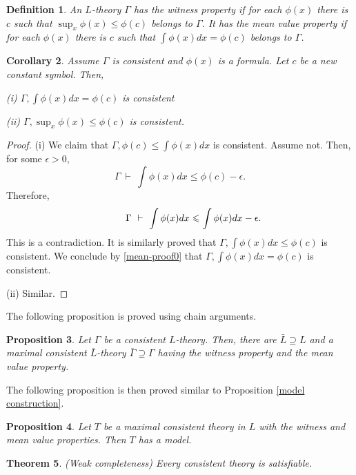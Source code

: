 \documentclass[12pt]{article}
\newtheorem{theorem}{Theorem}[section]
\newtheorem{proposition}[theorem]{Proposition}
\newtheorem{corollary}[theorem]{Corollary}
\newtheorem{definition}[theorem]{Definition}
\begin{document}
\begin{definition}
\em{An $L$-theory $\Gamma$ has \emph{the witness property} if for each $\phi(x)$ there is $c$ such that
$\sup_x\phi(x)\leqslant\phi(c)$ belongs to $\Gamma$. It has the \emph{mean value property}
if for each $\phi(x)$ there is $c$ such that $\int\phi(x)dx=\phi(c)$ belongs to $\Gamma$.}
\end{definition}

\begin{corollary}
Assume $\Gamma$ is consistent and $\phi(x)$ is a formula. Let $c$ be a new constant symbol. Then,

(i) $\Gamma,\int\phi(x)dx=\phi(c)$ is consistent

(ii) $\Gamma,\sup_x\phi(x)\leqslant\phi(c)$ is consistent.
\end{corollary}
\begin{proof}
(i) We claim that $\Gamma,\phi(c)\leqslant\int\phi(x)dx$ is consistent.
Assume not. Then, for some $\epsilon>0$, $$\Gamma\ \vdash\ \int\phi(x)dx\leqslant\phi(c)-\epsilon.$$
Therefore, $$\hspace{10mm}\Gamma\ \vdash\ \int\phi(x)dx\leqslant\int\phi(x)dx-\epsilon.$$
This is a contradiction. It is similarly proved that $\Gamma,\int\phi(x)dx\leqslant\phi(c)$
is consistent. We conclude by \ref{mean-proof0} that
$\Gamma,\int\phi(x)dx=\phi(c)$ is consistent.

(ii) Similar.
\end{proof}

The following proposition is proved using chain arguments.

\begin{proposition} \label{witness}
Let $\Gamma$ be a consistent $L$-theory. Then, there are $\bar L\supseteq L$ and a maximal
consistent $\bar L$-theory $\bar{\Gamma}\supseteq \Gamma$ having the witness property and the mean value property.
\end{proposition}

The following proposition is then proved similar to Proposition \ref{model construction}.

\begin{proposition}\label{completeness}
Let $T$ be a maximal consistent theory in $L$ with the witness and mean value properties.
Then $T$ has a model.
\end{proposition}

\begin{theorem}{\em(Weak completeness)} Every consistent theory is satisfiable.
\end{theorem}
\end{document}
